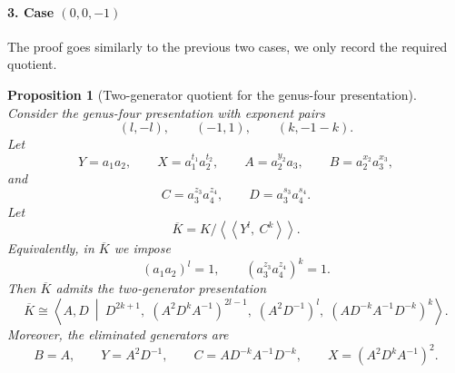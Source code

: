 \documentclass{article}
\newtheorem{prop}[theorem]{Proposition}
\begin{document}
\paragraph{3. Case $(0,0,-1)$} The proof goes similarly to the previous two cases, we only record the required quotient.
\begin{prop}[Two-generator quotient for the genus-four presentation]
Consider the genus-four presentation with exponent pairs
\[
(l,-l),\qquad (-1,1),\qquad (k,-1-k).
\]
Let
\[
Y=a_1a_2,\qquad
X=a_1^{t_1}a_2^{t_2},\qquad
A=a_2^{y_2}a_3,\qquad
B=a_2^{x_2}a_3^{x_3},
\]
and
\[
C=a_3^{z_3}a_4^{z_4},
\qquad
D=a_3^{s_3}a_4^{s_4}.
\]
Let
\[
\overline K
=
K/\left\langle\!\left\langle Y^l,\ C^k\right\rangle\!\right\rangle .
\]
Equivalently, in \(\overline K\) we impose
\[
(a_1a_2)^l=1,
\qquad
(a_3^{z_3}a_4^{z_4})^k=1.
\]
Then \(\overline K\) admits the two-generator presentation
\[
{
\overline K
\cong
\left\langle A,D\ \middle|\ 
D^{2k+1},\;
\left(A^2D^kA^{-1}\right)^{2l-1},\;
\left(A^2D^{-1}\right)^l,\;
\left(AD^{-k}A^{-1}D^{-k}\right)^k
\right\rangle .
}
\]
Moreover, the eliminated generators are
\[
{
B=A,\qquad
Y=A^2D^{-1},\qquad
C=AD^{-k}A^{-1}D^{-k},\qquad
X=\left(A^2D^kA^{-1}\right)^2.
}
\]
\end{prop}
\end{document}
